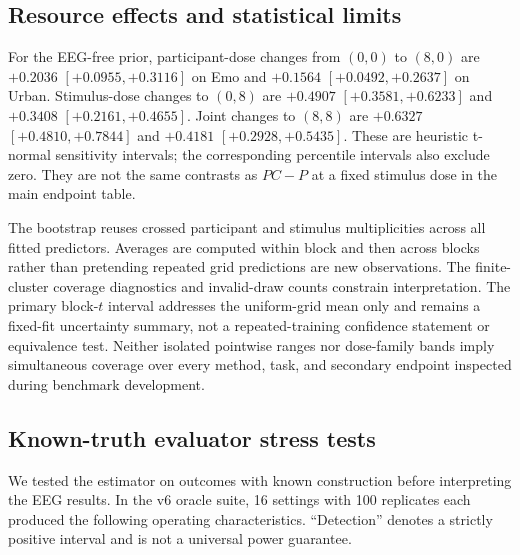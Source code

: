 \subsection{Resource effects and statistical limits}
For the EEG-free prior, participant-dose changes from $(0,0)$ to $(8,0)$ are
$+0.2036$ $[+0.0955,+0.3116]$ on Emo and $+0.1564$ $[+0.0492,+0.2637]$ on
Urban. Stimulus-dose changes to $(0,8)$ are $+0.4907$ $[+0.3581,+0.6233]$ and
$+0.3408$ $[+0.2161,+0.4655]$. Joint changes to $(8,8)$ are $+0.6327$
$[+0.4810,+0.7844]$ and $+0.4181$ $[+0.2928,+0.5435]$. These are heuristic
t-normal sensitivity intervals; the corresponding percentile intervals also
exclude zero. They are not the same contrasts as $PC-P$ at a fixed stimulus
dose in the main endpoint table.

The bootstrap reuses crossed participant and stimulus multiplicities across
all fitted predictors. Averages are computed within block and then across
blocks rather than pretending repeated grid predictions are new observations.
The finite-cluster coverage diagnostics and invalid-draw counts constrain
interpretation. The primary block-$t$ interval addresses the uniform-grid mean
only and remains a fixed-fit uncertainty summary, not a repeated-training
confidence statement or equivalence test. Neither isolated pointwise
ranges nor dose-family bands imply simultaneous coverage over every method,
task, and secondary endpoint inspected during benchmark development.

\subsection{Known-truth evaluator stress tests}
\label{app:evaluator-validation}
We tested the estimator on outcomes with known construction before interpreting
the EEG results. In the v6 oracle suite, 16 settings with 100 replicates each
produced the following operating characteristics. ``Detection'' denotes a
strictly positive interval and is not a universal power guarantee.

